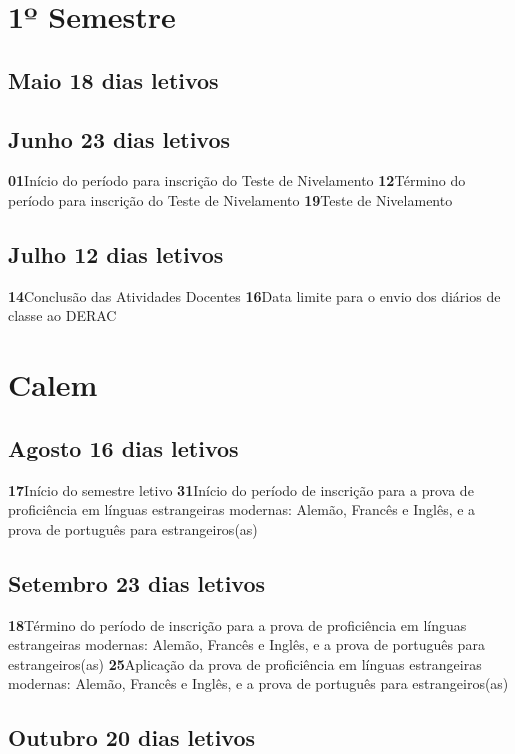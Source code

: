 \documentclass[thesis]{hmcposter}
\begin{document}
\begin{poster}
\section{\hfill \color{hmcorange}1º Semestre}
								\subsection{Maio \hfill 18 dias letivos}\subsection{Junho \hfill 23 dias letivos}\textbf{01}\qquad Início do período para inscrição do Teste de Nivelamento \newline \null\textbf{12}\qquad Término do período para inscrição do Teste de Nivelamento \newline \null\textbf{19}\qquad Teste de Nivelamento \newline \null\subsection{Julho \hfill 12 dias letivos}\textbf{14}\qquad Conclusão das Atividades Docentes \newline \null\textbf{16}\qquad Data limite para o envio dos diários de classe ao DERAC \newline \null\newpage
\section{\color{hmcorange}Calem}\subsection{Agosto \hfill 16 dias letivos}\textbf{17}\qquad Início do semestre letivo \newline \null\textbf{31}\qquad Início do período de inscrição para a prova de proficiência em línguas estrangeiras modernas: Alemão, Francês e Inglês, e a prova de português para estrangeiros(as) \newline \null\subsection{Setembro \hfill 23 dias letivos}\textbf{18}\qquad Término do período de inscrição para a prova de proficiência em línguas estrangeiras modernas: Alemão, Francês e Inglês, e a prova de português para estrangeiros(as) \newline \null\textbf{25}\qquad Aplicação da prova de proficiência em línguas estrangeiras modernas: Alemão, Francês e Inglês, e a prova de português para estrangeiros(as) \newline \null\subsection{Outubro \hfill 20 dias letivos}\vfill\null
\columnbreak

\end{poster}
\end{document}
